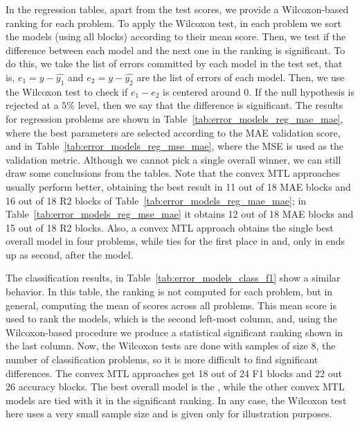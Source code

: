 In the regression tables, apart from the test scores, we provide a Wilcoxon-based ranking for each problem. 
%
To apply the Wilcoxon test, in each problem we sort the models (using all blocks) according to their mean score. Then, we test if the difference between each model and the next one in the ranking is significant. To do this, we take the list of errors committed by each model in the test set, that is, $e_1 = y - \hat{y_1}$ and $e_2 = y - \hat{y_2}$ are the list of errors of each model. Then, we use the Wilcoxon test to check if $e_1 - e_2$ is centered around 0.
If the null hypothesis is rejected at a $5\%$ level, then we say that the difference is significant.
%
%
The results for regression problems are shown in Table~\ref{tab:error_models_reg_mae_mae}, where the best parameters are selected according to the MAE validation score, and in Table~\ref{tab:error_models_reg_mse_mae}, where the MSE is used as the validation metric.
%
Although we cannot pick a single overall winner, we can still draw some conclusions from the tables. Note that the convex MTL approaches usually perform better, obtaining the best result in 11 out of 18 MAE blocks and 16 out of 18 R2 blocks of Table~\ref{tab:error_models_reg_mae_mae}; in Table~\ref{tab:error_models_reg_mse_mae} it obtains 12 out of 18 MAE blocks and 15 out of 18 R2 blocks.
Also, a convex MTL approach obtains the single best overall model in four problems, while ties for the first place in  and, only in  ends up as second, after the  model.

The classification results, in Table~\ref{tab:error_models_class_f1} show a similar behavior. In this table, the ranking is not computed for each problem, but in general, computing the mean of scores across all problems. This mean score is used to rank the models, which is the second left-most column, and, using the Wilcoxon-based procedure we produce a statistical significant ranking shown in the last column. Now, the Wilcoxon tests are done with samples of size $8$, the number of classification problems, so it is more difficult to find significant differences.
The convex MTL approaches get 18 out of 24 F1 blocks and 22 out 26 accuracy blocks. The best overall model is the , while the other convex MTL models are tied with it in the significant ranking.
In any case, the Wilcoxon test here uses a very small sample size and is given only for illustration purposes.

